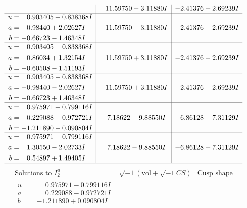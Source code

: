 \documentclass[1p]{elsarticle_modified}
\theoremstyle{definition}
\newcommand{\I}{\sqrt{-1}}
\begin{document}
$$\begin{array}{c|c|c}
 & \phantom{-}11.59750 - 3.11880 I & -2.41376 + 2.69239 I \\ \hline\begin{aligned}
u &= \phantom{-}0.903405 + 0.838368 I \\
a &= -0.98440 + 2.02627 I \\
b &= -0.66723 - 1.46348 I\end{aligned}
 & \phantom{-}11.59750 - 3.11880 I & -2.41376 + 2.69239 I \\ \hline\begin{aligned}
u &= \phantom{-}0.903405 - 0.838368 I \\
a &= \phantom{-}0.86034 + 1.32154 I \\
b &= -0.60508 - 1.51193 I\end{aligned}
 & \phantom{-}11.59750 + 3.11880 I & -2.41376 - 2.69239 I \\ \hline\begin{aligned}
u &= \phantom{-}0.903405 - 0.838368 I \\
a &= -0.98440 - 2.02627 I \\
b &= -0.66723 + 1.46348 I\end{aligned}
 & \phantom{-}11.59750 + 3.11880 I & -2.41376 - 2.69239 I \\ \hline\begin{aligned}
u &= \phantom{-}0.975971 + 0.799116 I \\
a &= \phantom{-}0.229088 + 0.972721 I \\
b &= -1.211890 - 0.090804 I\end{aligned}
 & \phantom{-}7.18622 - 9.88550 I & -6.86128 + 7.31129 I \\ \hline\begin{aligned}
u &= \phantom{-}0.975971 + 0.799116 I \\
a &= \phantom{-}1.30550 - 2.02733 I \\
b &= \phantom{-}0.54897 + 1.49405 I\end{aligned}
 & \phantom{-}7.18622 - 9.88550 I & -6.86128 + 7.31129 I\\
 \hline 
 \end{array}$$\newpage$$\begin{array}{c|c|c}  
\text{Solutions to }I^u_{2}& \I (\text{vol} + \sqrt{-1}CS) & \text{Cusp shape}\\
 \hline 
\begin{aligned}
u &= \phantom{-}0.975971 - 0.799116 I \\
a &= \phantom{-}0.229088 - 0.972721 I \\
b &= -1.211890 + 0.090804 I\end{aligned}

\end{array}$$
\end{document}

